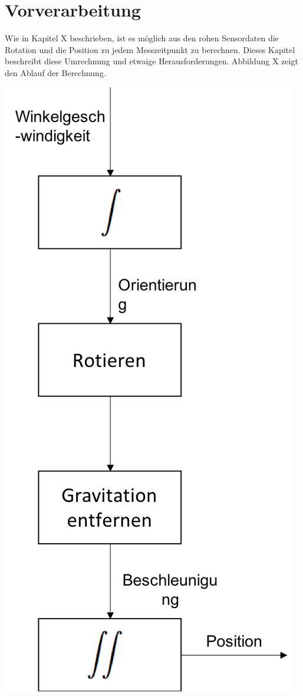 \chapter{Vorverarbeitung}
Wie in Kapitel X beschrieben, ist es möglich aus den rohen Sensordaten die Rotation und die Position zu jedem Messzeitpunkt zu berechnen. Dieses Kapitel beschreibt diese Umrechnung und etwaige Herausforderungen. Abbildung X zeigt den Ablauf der Berechnung.

\includegraphics[scale=0.5]{Bilder/WorkflowVorverarbeitung.png}

